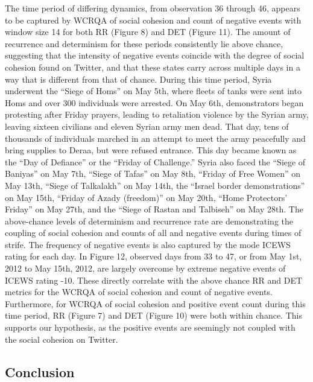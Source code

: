 \documentclass[english,man]{apa6}
\begin{document}
The time period of differing dynamics, from observation 36 through 46, appears to be captured by WCRQA of social cohesion and count of negative events with window size 14 for both RR (Figure 8) and DET (Figure 11). The amount of recurrence and determinism for these periods consistently lie above chance, suggesting that the intensity of negative events coincide with the degree of social cohesion found on Twitter, and that these states carry across multiple days in a way that is different from that of chance. During this time period, Syria underwent the \enquote{Siege of Homs} on May 5th, where fleets of tanks were sent into Homs and over 300 individuals were arrested. On May 6th, demonstrators began protesting after Friday prayers, leading to retaliation violence by the Syrian army, leaving sixteen civilians and eleven Syrian army men dead. That day, tens of thousands of individuals marched in an attempt to meet the army peacefully and bring supplies to Deraa, but were refused entrance. This day became known as the \enquote{Day of Defiance} or the \enquote{Friday of Challenge.} Syria also faced the \enquote{Siege of Baniyas} on May 7th, \enquote{Siege of Tafas} on May 8th, \enquote{Friday of Free Women} on May 13th, \enquote{Siege of Talkalakh} on May 14th, the \enquote{Israel border demonstrations} on May 15th, \enquote{Friday of Azady (freedom)} on May 20th, \enquote{Home Protectors' Friday} on May 27th, and the \enquote{Siege of Rastan and Talbiseh} on May 28th.
The above-chance levels of determinism and recurrence rate are demonstrating the coupling of social cohesion and counts of all and negative events during times of strife. The frequency of negative events is also captured by the mode ICEWS rating for each day. In Figure 12, observed days from 33 to 47, or from May 1st, 2012 to May 15th, 2012, are largely overcome by extreme negative events of ICEWS rating -10. These directly correlate with the above chance RR and DET metrics for the WCRQA of social cohesion and count of negative events. Furthermore, for WCRQA of social cohesion and positive event count during this time period, RR (Figure 7) and DET (Figure 10) were both within chance. This supports our hypothesis, as the positive events are seemingly not coupled with the social cohesion on Twitter.

\hypertarget{conclusion}{%
\subsection{Conclusion}\label{conclusion}}
\end{document}
